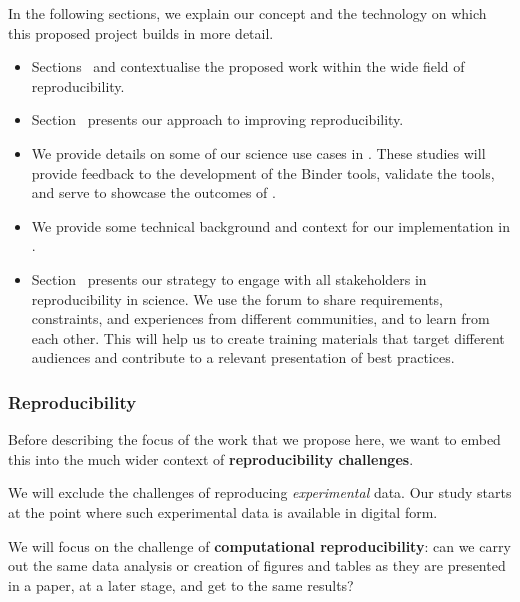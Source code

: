 In the following sections, we explain our concept and the technology on which this
proposed project builds in more detail.
\begin{itemize}
\item Sections~ and
   contextualise the proposed work
  within the wide field of reproducibility.
\item Section~ presents our approach to improving reproducibility.
\item We provide details on some of our science use cases in
  . These studies will provide feedback to the development of the
  Binder tools, validate the tools, and serve to showcase the outcomes of
  \TheProject.
\item We provide some technical background and context for our implementation in .
\item Section~ presents our strategy to
  engage with all stakeholders in reproducibility in science. We use the forum to
  share requirements, constraints, and experiences from different communities,
  and to learn from each other. This will help us to
  create training materials that target different audiences and
  contribute to a relevant presentation of best practices.

\end{itemize}

\medskip

\subsubsection{Reproducibility}\label{sec:concept}\label{sec:reproducibility}

Before describing the focus of the work that we propose here, we want to embed
this into the much wider context of \textbf{reproducibility challenges}.

We will exclude the challenges of reproducing \emph{experimental} data. Our
study starts at the point where such experimental data is available in digital
form.

We will focus on the challenge of \textbf{computational reproducibility}: can we carry out
the same data analysis or creation of figures and tables as they are presented in
a paper, at a later stage, and get to the same results?

